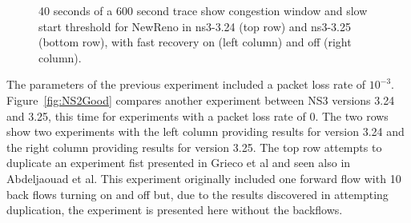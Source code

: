 \documentclass[conference]{IEEEtran}
\begin{document}
\begin{figure}[h!]
\begin{center}
\end{center}
\caption{40 seconds of a 600 second trace show congestion window and slow start threshold for NewReno in ns3-3.24 (top row) and ns3-3.25 (bottom row), with fast recovery on (left column) and off (right column).}
\label{fig:NS3Val}
\end{figure}

The parameters of the previous experiment included a packet loss rate of $10^{-3}$. Figure~\ref{fig:NS2Good} compares another experiment between NS3 versions 3.24 and 3.25, this time for experiments with a packet loss rate of 0. The two rows show two experiments with the left column providing results for version 3.24 and the right column providing results for version 3.25. The top row attempts to duplicate an experiment fist presented in Grieco et al\cite{NS2WP} and seen also in Abdeljaouad et al\cite{NS2Val}. This experiment originally included one forward flow with 10 back flows turning on and off but, due to the results discovered in attempting duplication, the experiment is presented here without the backflows. %
\end{document}

